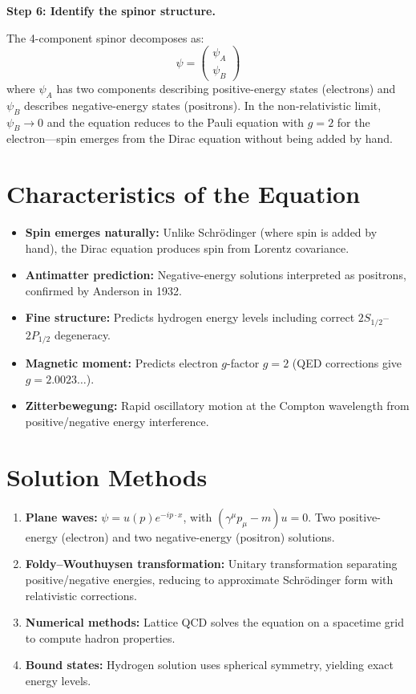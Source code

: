 \textbf{Step 6: Identify the spinor structure.}

The 4-component spinor decomposes as:
\begin{equation}
\psi = \begin{pmatrix} \psi_A \\ \psi_B \end{pmatrix}
\end{equation}
where $\psi_A$ has two components describing positive-energy states (electrons) and $\psi_B$ describes negative-energy states (positrons). In the non-relativistic limit, $\psi_B \to 0$ and the equation reduces to the Pauli equation with $g = 2$ for the electron---spin emerges from the Dirac equation without being added by hand.

\section*{Characteristics of the Equation}

\begin{itemize}
\item \textbf{Spin emerges naturally:} Unlike Schr\"odinger (where spin is added by hand), the Dirac equation produces spin from Lorentz covariance.
\item \textbf{Antimatter prediction:} Negative-energy solutions interpreted as positrons, confirmed by Anderson in 1932.
\item \textbf{Fine structure:} Predicts hydrogen energy levels including correct $2S_{1/2}$--$2P_{1/2}$ degeneracy.
\item \textbf{Magnetic moment:} Predicts electron $g$-factor $g = 2$ (QED corrections give $g = 2.0023\ldots$).
\item \textbf{Zitterbewegung:} Rapid oscillatory motion at the Compton wavelength from positive/negative energy interference.
\end{itemize}
\section*{Solution Methods}

\begin{enumerate}
\item \textbf{Plane waves:} $\psi = u(p) e^{-ip \cdot x}$, with $(\gamma^\mu p_\mu - m) u = 0$. Two positive-energy (electron) and two negative-energy (positron) solutions.
\item \textbf{Foldy--Wouthuysen transformation:} Unitary transformation separating positive/negative energies, reducing to approximate Schr\"odinger form with relativistic corrections.
\item \textbf{Numerical methods:} Lattice QCD solves the equation on a spacetime grid to compute hadron properties.
\item \textbf{Bound states:} Hydrogen solution uses spherical symmetry, yielding exact energy levels.
\end{enumerate}
